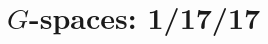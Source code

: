 \documentclass{style_EHT}
\begin{document}
\frontstuff

\section{$G$-spaces: 1/17/17}
	



{}

\end{document}

